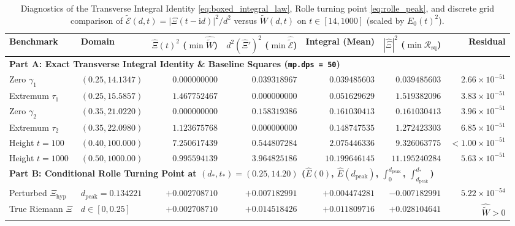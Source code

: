 \documentclass[11pt,a4paper,reqno]{amsart}
\theoremstyle{definition}
\theoremstyle{remark}
\numberwithin{equation}{section}
\newcommand{\ii}{\mathrm{i}}
\newcommand{\Wtil}{\widetilde{W}}
\newcommand{\Etil}{\widetilde{\mathcal{E}}}
\begin{document}
\begin{table}[htbp]
\centering
\caption{Diagnostics of the Transverse Integral Identity \eqref{eq:boxed_integral_law}, Rolle turning point \eqref{eq:rolle_peak}, and discrete grid comparison of $\Etil(d,t) = |\Xi(t-\ii d)|^2/d^2$ versus $\Wtil(d,t)$ on $t \in [14, 1000]$ (scaled by $E_0(t)^2$).}\label{tab:integral_law_gpu}
\scriptsize
\setlength{\tabcolsep}{2.0pt}
\begin{tabular}{llrrrrr}
\toprule
\textbf{Benchmark} & \textbf{Domain} & \textbf{$\widehat{\Xi}(t)^2$ ($\min\widehat{\Wtil}$)} & \textbf{$d^2(\widehat{\Xi}')^2$ ($\min\widehat{\Etil}$)} & \textbf{Integral (Mean)} & \textbf{$|\widehat{\Xi}|^2$ ($\min\mathcal{R}_{\mathrm{sq}}$)} & \textbf{Residual} \\
\midrule
\multicolumn{7}{l}{\textbf{Part A: Exact Transverse Integral Identity \& Baseline Squares (\texttt{mp.dps = 50})}} \\
Zero $\gamma_1$      & $(0.25, 14.1347)$ & $0.000000000$ & $0.039318967$ & $0.039485603$  & $0.039485603$  & $2.66 \times 10^{-51}$ \\
Extremum $\tau_1$    & $(0.25, 15.5857)$ & $1.467752467$ & $0.000000000$ & $0.051629629$  & $1.519382096$  & $3.83 \times 10^{-51}$ \\
Zero $\gamma_2$      & $(0.35, 21.0220)$ & $0.000000000$ & $0.158319386$ & $0.161030413$  & $0.161030413$  & $3.96 \times 10^{-51}$ \\
Extremum $\tau_2$    & $(0.35, 22.0980)$ & $1.123675768$ & $0.000000000$ & $0.148747535$  & $1.272423303$  & $6.85 \times 10^{-51}$ \\
Height $t = 100$     & $(0.40, 100.000)$ & $7.250617439$ & $0.544807284$ & $2.075446336$  & $9.326063775$  & $< 1.00 \times 10^{-51}$ \\
Height $t = 1000$    & $(0.50, 1000.00)$ & $0.995594139$ & $3.964825186$ & $10.199646145$ & $11.195240284$ & $5.63 \times 10^{-51}$ \\
\midrule
\multicolumn{7}{l}{\textbf{Part B: Conditional Rolle Turning Point at $(d_*, t_*) = (0.25, 14.20)$ ($\widehat{E}(0)$, $\widehat{E}(d_{\mathrm{peak}})$, $\int_0^{d_{\mathrm{peak}}}$, $\int_{d_{\mathrm{peak}}}^{d_*}$)}} \\
Perturbed $\Xi_{\mathrm{hyp}}$ & $d_{\mathrm{peak}} = 0.134221$ & $+0.002708710$ & $+0.007182991$ & $+0.004474281$ & $-0.007182991$ & $5.22 \times 10^{-54}$ \\
True Riemann $\Xi$   & $d \in [0, 0.25]$ & $+0.002708710$ & $+0.014518426$ & $+0.011809716$ & $+0.028104641$ & $\widehat{\Wtil} > 0$ \\

\end{tabular}
\end{table}
\end{document}
